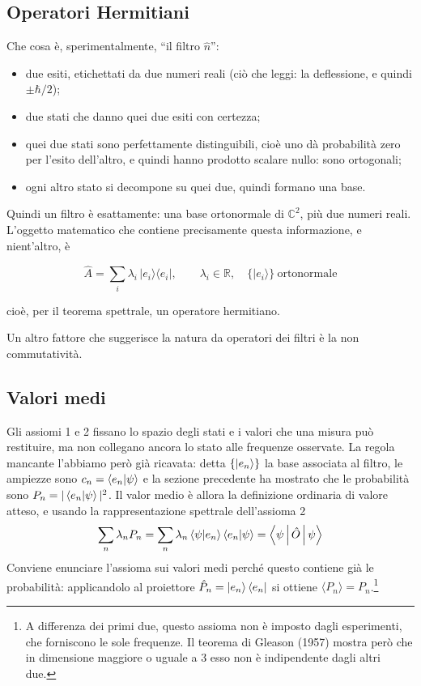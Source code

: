 \subsection*{Operatori Hermitiani}

Che cosa è, sperimentalmente, “il filtro $\hat{n}$”:
\begin{itemize}
  \item due esiti, etichettati da due numeri reali (ciò che leggi: la deflessione, e quindi $\pm\hbar/2$);
  \item due stati che danno quei due esiti con certezza;
  \item quei due stati sono perfettamente distinguibili, cioè uno dà probabilità zero per l’esito dell’altro, e quindi hanno prodotto scalare nullo: sono ortogonali;
  \item ogni altro stato si decompone su quei due, quindi formano una base.
\end{itemize}

Quindi un filtro è esattamente: una base ortonormale di $\mathbb C^2$, più due numeri reali. L’oggetto matematico che contiene precisamente questa informazione, e nient’altro, è

$$\hat A = \sum_i \lambda_i\,|e_i\rangle\langle e_i|,\qquad \lambda_i\in\mathbb R,\quad \{|e_i\rangle\}\ \text{ortonormale}$$

cioè, per il teorema spettrale, un operatore hermitiano. 

Un altro fattore che suggerisce la natura da operatori dei filtri è la non commutatività.%

\subsection*{Valori medi}

Gli assiomi 1 e 2 fissano lo spazio degli stati e i valori che una misura può
restituire, ma non collegano ancora lo stato alle frequenze osservate. La regola
mancante l'abbiamo però già ricavata: detta $\{\ket{e_n}\}$ la base associata al
filtro, le ampiezze sono $c_n = \braket{e_n|\psi}$ e la sezione precedente ha
mostrato che le probabilità sono $P_n = |\braket{e_n|\psi}|^2$. Il valor medio è
allora la definizione ordinaria di valore atteso, e usando la rappresentazione
spettrale dell'assioma 2
%
\begin{equation}
    \sum_n \lambda_n P_n
    = \sum_n \lambda_n \braket{\psi|e_n}\braket{e_n|\psi}
    = \Braket{\psi|\hat{O}|\psi}
\end{equation}
%
Conviene enunciare l'assioma sui valori medi perché questo contiene già le
probabilità: applicandolo al proiettore $\hat{P}_n = \ket{e_n}\bra{e_n}$ si
ottiene $\langle P_n \rangle = P_n$.\footnote{A differenza dei primi due, questo
assioma non è imposto dagli esperimenti, che forniscono le sole frequenze. Il
teorema di Gleason (1957) mostra però che in dimensione maggiore o uguale a $3$
esso non è indipendente dagli altri due.}